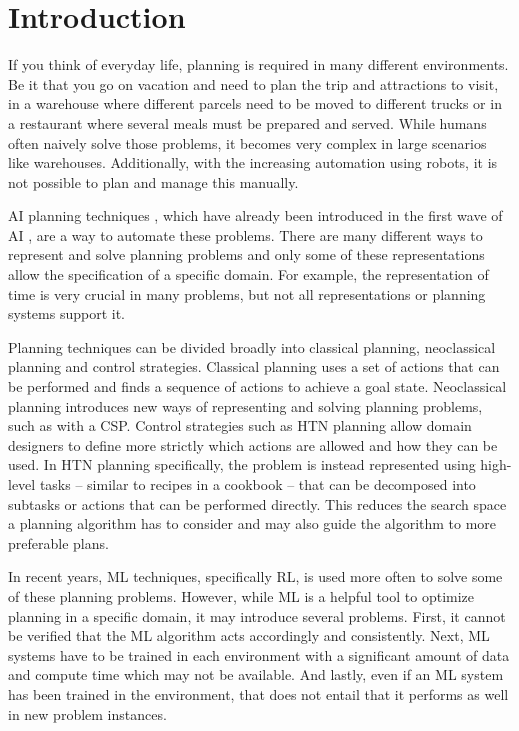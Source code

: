 \section{Introduction}\label{sec:introduction}

If you think of everyday life, planning is required in many different environments.
Be it that you go on vacation and need to plan the trip and attractions to visit, in a warehouse where different parcels need to be moved to different trucks or in a restaurant where several meals must be prepared and served.
While humans often naively solve those problems, it becomes very complex in large scenarios like warehouses.
Additionally, with the increasing automation using robots, it is not possible to plan and manage this manually.

\ac{AI} planning techniques \citep{ghallabAutomatedPlanningTheory2004}, which have already been introduced in the first wave of \ac{AI} \citep{fikesSTRIPSNewApproach1971}, are a way to automate these problems.
There are many different ways to represent and solve planning problems and only some of these representations allow the specification of a specific domain.
For example, the representation of time is very crucial in many problems, but not all representations or planning systems support it.

Planning techniques can be divided broadly into classical planning, neoclassical planning and control strategies.
Classical planning uses a set of actions that can be performed and finds a sequence of actions to achieve a goal state.
Neoclassical planning introduces new ways of representing and solving planning problems, such as with a \ac{CSP}.
Control strategies such as \ac{HTN} planning allow domain designers to define more strictly which actions are allowed and how they can be used.
In \ac{HTN} planning specifically, the problem is instead represented using high-level tasks -- similar to recipes in a cookbook -- that can be decomposed into subtasks or actions that can be performed directly.
This reduces the search space a planning algorithm has to consider and may also guide the algorithm to more preferable plans.

In recent years, \ac{ML} techniques, specifically \ac{RL}, is used more often to solve some of these planning problems.
However, while \ac{ML} is a helpful tool to optimize planning in a specific domain, it may introduce several problems.
First, it cannot be verified that the \ac{ML} algorithm acts accordingly and consistently.
Next, \ac{ML} systems have to be trained in each environment with a significant amount of data and compute time which may not be available.
And lastly, even if an \ac{ML} system has been trained in the environment, that does not entail that it performs as well in new problem instances.

